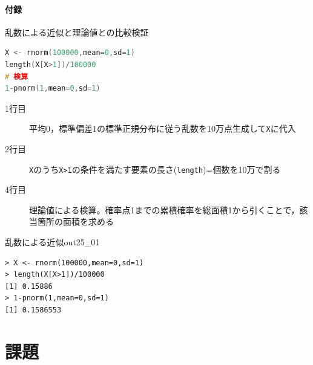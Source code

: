 \documentclass{ltjsarticle}
\begin{document}
\paragraph{付録}乱数による近似と理論値との比較検証


\begin{lstlisting}[language=c++,label={code:25_01},caption={近似値と検算}]
X <- rnorm(100000,mean=0,sd=1)
length(X[X>1])/100000
# 検算
1-pnorm(1,mean=0,sd=1)
\end{lstlisting}
\begin{description}
	\item[1行目] 平均$0$，標準偏差$1$の標準正規分布に従う乱数を10万点生成して\texttt{X}に代入
	\item[2行目] \texttt{X}のうち\texttt{X>1}の条件を満たす要素の長さ(\texttt{length})=個数を10万で割る
	\item[4行目] 理論値による検算。確率点1までの累積確率を総面積1から引くことで，該当箇所の面積を求める
\end{description}

\begin{Rscreen}{乱数による近似}{out25_01}
	\begin{verbatim}
> X <- rnorm(100000,mean=0,sd=1)
> length(X[X>1])/100000
[1] 0.15886
> 1-pnorm(1,mean=0,sd=1)
[1] 0.1586553\end{verbatim}
\end{Rscreen}
\section{課題}
\end{document}
